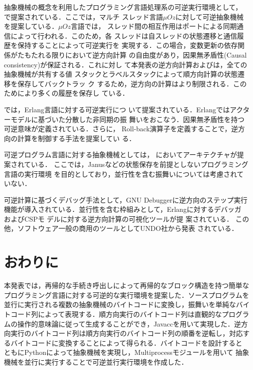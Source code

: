 \documentclass[submit,PRO]{ipsj}
\begin{document}
抽象機械の概念を利用したプログラミング言語処理系の可逆実行環境として，
\cite{DBLP:conf/forte/LienhardtLMS12}で提案されている．ここでは，マルチ
スレッド言語$\mu Oz$に対して可逆抽象機械を提案している．$\mu Oz$言語では，
スレッド間の相互作用はポートによる同期通信によって行われる．このため，各
スレッドは自スレッドの状態遷移と通信履歴を保持することによって可逆実行を
実現する．この場合，変数更新の依存関係がたもたれる限りにおいて逆方向計算
の自由度があり，因果無矛盾性(Causal consistency)が保証される．これに対し
て本発表の逆方向計算および\cite{Hoey20PHD}は，全ての抽象機械が共有する値
スタックとラベルスタックによって順方向計算の状態遷移を保存してバックトラッ
ク
\cite{DBLP:journals/software/AgrawalDS91,DBLP:journals/corr/abs-1709-00828}
するため，逆方向の計算はより制限される．このためにより多くの履歴を保存し
ている．

\cite{DBLP:journals/jlp/LaneseNPV18}では，Erlang言語に対する可逆実行につ
いて提案されている．Erlangではアクターモデルに基づいた分散した非同期の振
舞いをおこなう．因果無矛盾性を持つ可逆意味が定義されている．さらに，
Roll-back演算子を定義することで，逆方向の計算を制御する手法を提案してい
る．

可逆プログラム言語に対する抽象機械としては，
\cite{DBLP:conf/csr/AxelsenGY07}においてアーキテクチャが提案されている．
ここでは，Janusなどの状態保存を前提としないプログラミング言語の実行環境
を目的としており，並行性を含む振舞いについては考慮されていない．

可逆計算に基づくデバッグ手法として，GNU Debugger\cite{GDB}に逆方向のステップ実行
機能が導入されている．並行性を含む枠組みとして，Erlangに対するデバッガ
\cite{DBLP:conf/flops/Lanese0PV18,DBLP:conf/forte/LanesePV19}およびCSPモ
デルに対する逆方向計算の可視化ツール\cite{DBLP:conf/rc/Galindo0ST20}が提
案されている．
この他，ソフトウェア一般の商用のツールとしてUNDO社から発表
\cite{UNDODebugger}されている．

\section{おわりに}

本発表では，再帰的な手続き呼出しによって再帰的なブロック構造を持つ簡単な
プログラミング言語に対する可逆的な実行環境を提案した．ソースプログラムを
並行に実行される複数の抽象機械のバイトコードに変換し，振舞いを単純なバイ
トコード列によって表現する．順方向実行のバイトコード列は直観的なプログラ
ムの操作的意味論に従って生成することができ，Javaccを用いて実現した．逆方
向実行のバイトコード列は順方向実行のバイトコード列の順番を逆転し，対応す
るバイトコードに変換することによって得られる．バイトコードを設計すると
ともにPythonによって抽象機械を実現し，Multiprocessモジュールを用いて
抽象機械を並行に実行することで可逆並行実行環境を作成した．
\end{document}
